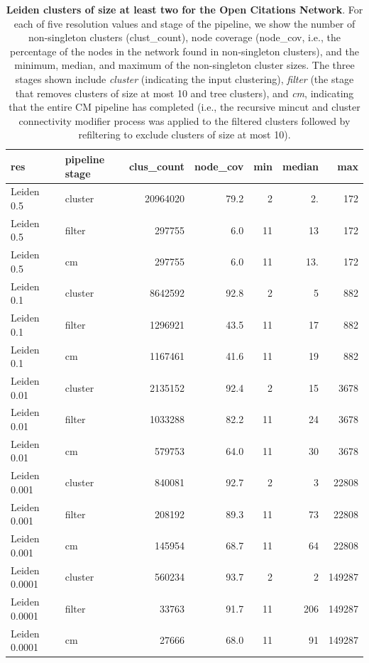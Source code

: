 \documentclass[11pt]{article}   	%
\begin{document}
\begin{table}[H]
\centering
\begin{tabular}{llrrrrr}
  \hline
  res & pipeline stage & clus\_count & node\_cov & min & median & max \\
  \hline
  Leiden 0.5 & cluster & 20964020 & 79.2 &   2 & 2. & 172 \\
    Leiden 0.5 & filter & 297755 & 6.0 &  11 & 13 & 172 \\
    Leiden 0.5 & cm & 297755 & 6.0 &  11 & 13. & 172 \\
  \hline
    Leiden 0.1 & cluster & 8642592 & 92.8 &   2 & 5 & 882 \\
    Leiden 0.1 & filter & 1296921 & 43.5 &  11 & 17 & 882 \\
    Leiden 0.1 & cm & 1167461 & 41.6 &  11 & 19 & 882 \\
  \hline
    Leiden 0.01 & cluster & 2135152 & 92.4 &   2 & 15 & 3678 \\
   Leiden 0.01 & filter & 1033288 & 82.2 &  11 & 24 & 3678 \\
    Leiden 0.01 & cm & 579753 & 64.0 &  11 & 30 & 3678 \\
  \hline
   Leiden 0.001 & cluster & 840081 & 92.7 &   2 & 3 & 22808 \\
   Leiden 0.001 & filter & 208192 & 89.3 &  11 & 73 & 22808 \\
    Leiden 0.001 & cm & 145954 & 68.7 &  11 & 64 & 22808 \\
  \hline
    Leiden 0.0001 & cluster & 560234 & 93.7 &   2 & 2 & 149287 \\
    Leiden 0.0001 & filter & 33763 & 91.7 &  11 & 206 & 149287 \\
   Leiden 0.0001 & cm & 27666 & 68.0 &  11 & 91 & 149287 \\
   \hline
\end{tabular}
\caption{\textbf{Leiden clusters of size at least two for the Open Citations Network}. For each of five resolution values and stage of the pipeline, we show  the number of non-singleton clusters (clust\_count), node coverage (node\_cov, i.e., the percentage  of the nodes in the network found in non-singleton clusters), and the minimum, median, and maximum of the non-singleton cluster sizes.  The three stages shown include  \emph{cluster} (indicating the input clustering), \emph{filter} (the stage that removes  clusters of size at most 10 and tree clusters), and  \emph{cm}, indicating that the entire CM pipeline has completed (i.e.,  the recursive mincut and cluster connectivity modifier process was applied to the filtered clusters followed by refiltering to exclude clusters of size at most 10).}
\label{tab: cm_stats}
\end{table}
\end{document}
